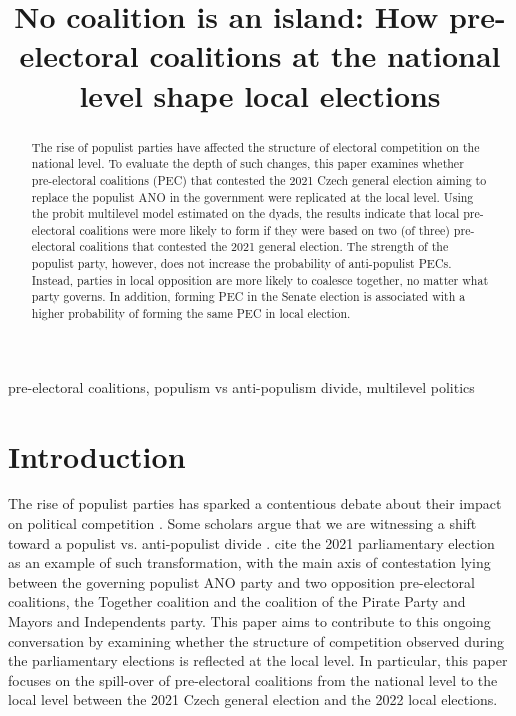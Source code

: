 \documentclass[]{interact}
\theoremstyle{plain}%
\theoremstyle{definition}
\theoremstyle{remark}
\begin{document}
\title{No coalition is an island: How pre-electoral coalitions at the national level shape local elections}

\author{
}

\maketitle

\begin{abstract}
The rise of populist parties have affected the structure of electoral competition on the national level. To evaluate the depth of such changes, this paper examines whether pre-electoral coalitions (PEC) that contested the 2021 Czech general election aiming to replace the populist ANO in the government were replicated at the local level. 
Using the probit multilevel model estimated on the dyads, the results indicate that local pre-electoral coalitions were more likely to form if they were based on two (of three) pre-electoral coalitions that contested the 2021 general election. The strength of the populist party, however, does not increase the probability of anti-populist PECs. Instead, parties in local opposition are more likely to coalesce together, no matter what party governs. In addition, forming PEC in the Senate election is associated with a higher probability of forming the same PEC in local election.
\end{abstract}

\begin{keywords}
pre-electoral coalitions, populism vs anti-populism divide, multilevel politics
\end{keywords}


\section{Introduction}

The rise of populist parties has sparked a contentious debate about their impact on political competition \citep[e.g.][]{vachudova2021,moffitt2018}. Some scholars argue that we are witnessing a shift toward a populist vs. anti-populist divide \citep{moffitt2018}. \citet{havlik2022} cite the 2021 parliamentary election as an example of such transformation, with the main axis of contestation lying between the governing populist ANO party and two opposition pre-electoral coalitions, the Together coalition and the coalition of the Pirate Party and Mayors and Independents party. This paper aims to contribute to this ongoing conversation by examining whether the structure of competition observed during the parliamentary elections is reflected at the local level. In particular, this paper focuses on the spill-over of pre-electoral coalitions from the national level to the local level between the 2021 Czech general election and the 2022 local elections. 
\end{document}
